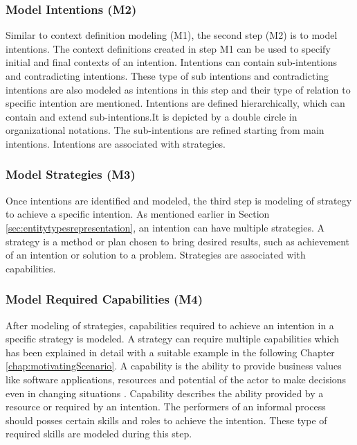 \subsubsection{Model Intentions (M2)}  
Similar to context definition modeling (M1), the second step (M2) is to model intentions. The context definitions created in step M1 can be used to specify initial and final contexts of an intention. Intentions can contain sub-intentions and contradicting intentions. These type of sub intentions and contradicting intentions are also modeled as intentions in this step and their type of relation to specific intention are mentioned. Intentions are defined hierarchically, which can contain and extend sub-intentions.It is depicted by a double circle in organizational notations. The sub-intentions are refined starting from main intentions. Intentions are associated with strategies.

\subsubsection{Model Strategies (M3)}  
Once intentions are identified and modeled, the third step is modeling of strategy to achieve a specific intention. As mentioned earlier in Section \ref{sec:entitytypesrepresentation}, an intention can have multiple strategies.  A  strategy is a method or plan chosen to bring  desired results, such as achievement of an intention or solution to a problem. Strategies are associated with capabilities. 

\subsubsection{Model Required Capabilities (M4)}  
After modeling of strategies, capabilities required to achieve an intention in a specific strategy is modeled. A strategy can require multiple capabilities which has been explained in detail with a suitable example in the following Chapter \ref{chap:motivatingScenario}. 
A capability is the ability to provide business values like software applications, resources and potential of the actor to make decisions even in changing situations \cite{Stirna2012}. Capability describes the ability provided by a resource or required by an intention. The performers of an informal process should posses certain skills and roles to achieve the intention. These type of required skills are modeled during this step.

